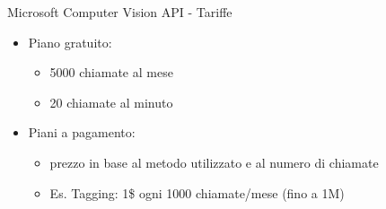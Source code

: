%
\begin{frame}[t]{Microsoft Computer Vision API - Tariffe}
\begin{itemize}
	\item Piano gratuito:
	\begin{itemize}
		\item 5000 chiamate al mese
		\item 20 chiamate al minuto
	\end{itemize}
	\item Piani a pagamento:
	\begin{itemize}
		\item prezzo in base al metodo utilizzato e al numero di chiamate
		\item Es. Tagging: 1\$ ogni 1000 chiamate/mese (fino a 1M)
	\end{itemize}
\end{itemize}
\end{frame}
%
